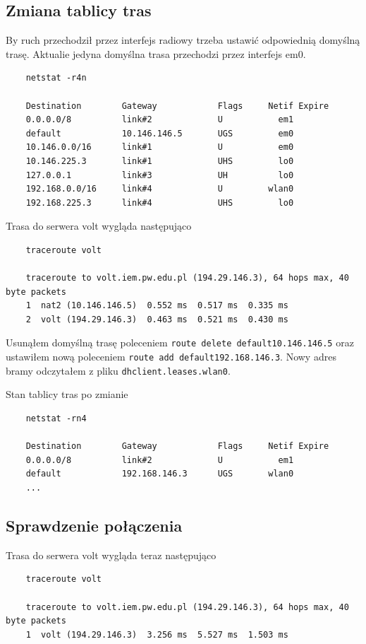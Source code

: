 \documentclass{article} %
\begin{document}
\subsection{Zmiana tablicy tras}
By ruch przechodził przez interfejs radiowy trzeba ustawić odpowiednią domyślną trasę.
Aktualie jedyna domyślna trasa przechodzi przez interfejs em0.
\begin{lstlisting}
    netstat -r4n

    Destination        Gateway            Flags     Netif Expire
    0.0.0.0/8          link#2             U           em1
    default            10.146.146.5       UGS         em0
    10.146.0.0/16      link#1             U           em0
    10.146.225.3       link#1             UHS         lo0
    127.0.0.1          link#3             UH          lo0
    192.168.0.0/16     link#4             U         wlan0
    192.168.225.3      link#4             UHS         lo0
\end{lstlisting}

Trasa do serwera volt wygląda następująco
\begin{lstlisting}
    traceroute volt

    traceroute to volt.iem.pw.edu.pl (194.29.146.3), 64 hops max, 40 byte packets 
    1  nat2 (10.146.146.5)  0.552 ms  0.517 ms  0.335 ms 
    2  volt (194.29.146.3)  0.463 ms  0.521 ms  0.430 ms
\end{lstlisting}

Usunąłem domyślną trasę poleceniem \texttt{route delete default10.146.146.5} oraz ustawiłem nową poleceniem \texttt{route add default192.168.146.3}. Nowy adres bramy odczytałem z pliku \texttt{dhclient.leases.wlan0}.

Stan tablicy tras po zmianie
\begin{lstlisting}
    netstat -rn4

    Destination        Gateway            Flags     Netif Expire
    0.0.0.0/8          link#2             U           em1
    default            192.168.146.3      UGS       wlan0
    ...
\end{lstlisting}

\subsection{Sprawdzenie połączenia}
Trasa do serwera volt wygląda teraz następująco
\begin{lstlisting}
    traceroute volt

    traceroute to volt.iem.pw.edu.pl (194.29.146.3), 64 hops max, 40 byte packets
    1  volt (194.29.146.3)  3.256 ms  5.527 ms  1.503 ms
\end{lstlisting}
\end{document}
